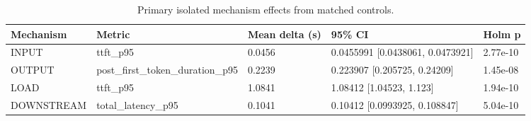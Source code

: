 \begin{table}[t]
\centering
\small
\caption{Primary isolated mechanism effects from matched controls.}
\begin{tabular}{lllll}
\hline
Mechanism & Metric & Mean delta (s) & 95\% CI & Holm p \\
\hline
INPUT & ttft\_p95 & 0.0456 & 0.0455991 [0.0438061, 0.0473921] & 2.77e-10 \\
OUTPUT & post\_first\_token\_duration\_p95 & 0.2239 & 0.223907 [0.205725, 0.24209] & 1.45e-08 \\
LOAD & ttft\_p95 & 1.0841 & 1.08412 [1.04523, 1.123] & 1.94e-10 \\
DOWNSTREAM & total\_latency\_p95 & 0.1041 & 0.10412 [0.0993925, 0.108847] & 5.04e-10 \\
\hline
\end{tabular}
\end{table}
